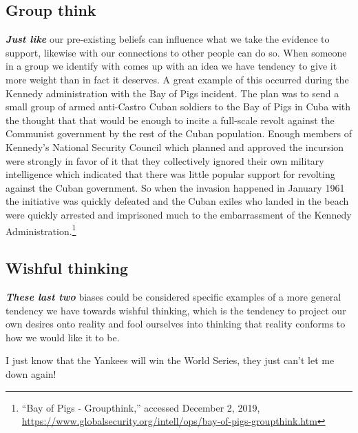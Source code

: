 \documentclass[12pt, openany]{book}
\begin{document}
\hypertarget{group-think}{%
\subsection*{Group think}\label{group-think}}


\textbf{\emph{Just like}} our pre-existing beliefs can influence what we take the evidence to support, likewise with our connections to other people can do so. When someone in a group we identify with comes up with an idea we have tendency to give it more weight than in fact it deserves. A great example of this occurred during the Kennedy administration with the Bay of Pigs incident. The plan was to send a small group of armed anti-Castro Cuban soldiers to the Bay of Pigs in Cuba with the thought that that would be enough to incite a full-scale revolt against the Communist government by the rest of the Cuban population. Enough members of Kennedy's National Security Council which planned and approved the incursion were strongly in favor of it that they collectively ignored their own military intelligence which indicated that there was little popular support for revolting against the Cuban government. So when the invasion happened in January 1961 the initiative was quickly defeated and the Cuban exiles who landed in the beach were quickly arrested and imprisoned much to the embarrassment of the Kennedy Administration.\footnote{``Bay of Pigs - Groupthink,'' accessed December 2, 2019, \url{https://www.globalsecurity.org/intell/ops/bay-of-pigs-groupthink.htm}}

\hypertarget{wishful-thinking}{%
\subsection*{Wishful thinking}\label{wishful-thinking}}


\textbf{\emph{These last two}} biases could be considered specific examples of a more general tendency we have towards wishful thinking, which is the tendency to project our own desires onto reality and fool ourselves into thinking that reality conforms to how we would like it to be.

\begin{center}

\begin{argument}

I just know that the Yankees will win the World Series, they just can't let me down again!

\end{argument}

\end{center}
\end{document}
